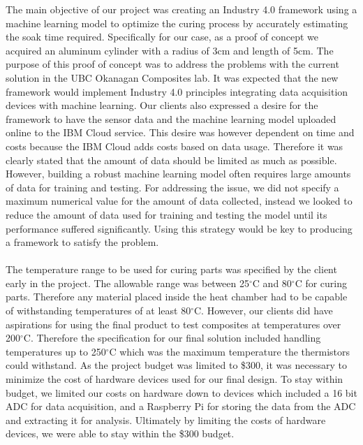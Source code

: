 The main objective of our project was creating an Industry 4.0 framework using a machine learning model to optimize the curing process by accurately estimating the soak time required. Specifically for our case, as a proof of concept we acquired an aluminum cylinder with a radius of 3cm and length of 5cm. The purpose of this proof of concept was to address the problems with the current solution in the UBC Okanagan Composites lab. It was expected that the new framework would implement Industry 4.0 principles integrating data acquisition devices with machine learning. Our clients also expressed a desire for the framework to have the sensor data and the machine learning model uploaded online to the IBM Cloud service. This desire was however dependent on time and costs because the IBM Cloud adds costs based on data usage. Therefore it was clearly stated that the amount of data should be limited as much as possible. However, building a robust machine learning model often requires large amounts of data for training and testing. For addressing the issue, we did not specify a maximum numerical value for the amount of data collected, instead we looked to reduce the amount of data used for training and testing the model until its performance suffered signiﬁcantly. Using this strategy would be key to producing a framework to satisfy the problem.\\\\
The temperature range to be used for curing parts was specified by the client early in the project. The allowable range was between 25$^\circ$C and 80$^\circ$C for curing parts. Therefore any material placed inside the heat chamber had to be capable of withstanding temperatures of at least 80$^\circ$C. However, our clients did have aspirations for using the final product to test composites at temperatures over 200$^\circ$C. Therefore the specification for our final solution included handling temperatures up to 250$^\circ$C which was the maximum temperature the thermistors could withstand. 
As the project budget was limited to \$300, it was necessary to minimize the cost of hardware devices used for our final design. To stay within budget, we limited our costs on hardware down to devices which included a 16 bit ADC for data acquisition, and a Raspberry Pi for storing the data from the ADC and extracting it for analysis. Ultimately by limiting the costs of hardware devices, we were able to stay within the \$300 budget.